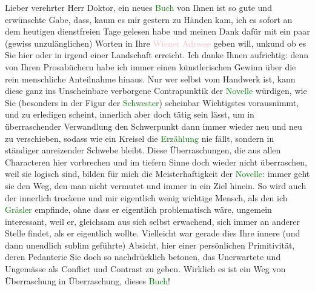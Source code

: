 \pstart{}Lieber verehrter Herr Doktor,\pend
\pstart
           ein neues \textcolor{green}{Buch}{}\ledrightnote{{$\rightarrow$}\textcolor{green}{Doktor Gräsler, Badearzt}} von Ihnen ist
               so gute und erwünschte Gabe, dass, kaum es mir gestern zu Händen kam, ich es sofort
               an dem heutigen dienstfreien Tage gelesen habe und meinen Dank dafür mit ein paar
               (gewiss unzulänglichen) Worten in Ihre \textcolor{pink}{Wiener Adresse}{}\ledrightnote{{$\rightarrow$}\textcolor{pink}{Sternwartestraße 71}} geben will, unkund ob es Sie hier oder in
               irgend einer Landschaft erreicht. Ich danke Ihnen aufrichtig: denn von Ihren
               Prosabüchern habe ich immer einen künstlerischen Gewinn über die rein menschliche
               Anteilnahme hinaus. Nur wer selbst vom Handwerk ist, kann diese ganz ins Unscheinbare
               verborgene Contrapunktik der \textcolor{green}{Novelle}{}\ledrightnote{{$\rightarrow$}\textcolor{green}{Doktor Gräsler, Badearzt}} würdigen, wie Sie (besonders in der Figur der \textcolor{green}{Schwester}{}\ledrightnote{{$\rightarrow$}\textcolor{green}{Doktor Gräsler, Badearzt}}) scheinbar Wichtigstes
               vorausnimmt, {\pb}und zu erledigen scheint,
               innerlich aber doch tätig sein lässt, um in überraschender Verwandlung den
               Schwerpunkt dann immer wieder neu und neu zu verschieben, sodass wie ein Kreisel die
                  \textcolor{green}{Erzählung}{}\ledrightnote{{$\rightarrow$}\textcolor{green}{Doktor Gräsler, Badearzt}} nie fällt,
               sondern in ständiger anreizender Schwebe bleibt. Diese Überraschungen, die aus allen
               Characteren hier vorbrechen und im tiefern Sinne doch wieder nicht überraschen, weil
               sie logisch sind, bilden für mich die Meisterhaftigkeit der \textcolor{green}{Novelle}{}\ledrightnote{{$\rightarrow$}\textcolor{green}{Doktor Gräsler, Badearzt}}: immer geht sie den Weg, den man
               nicht vermutet und immer in ein Ziel hinein. So wird auch der innerlich trockene und
               mir eigentlich wenig wichtige Mensch, als den ich \textcolor{green}{Gräsler}{}\ledrightnote{{$\rightarrow$}\textcolor{green}{Doktor Gräsler, Badearzt}} empfinde, ohne dass er eigentlich problematisch
               wäre, ungemein interessant, weil er, gleichsam aus sich selbst erwachend, sich immer
               an anderer Stelle findet, als er eigentlich wollte. Vielleicht war gerade dies Ihre
               innere (und dann unendlich sublim geführte) Absicht, hier einer persönlichen
               Primitivität, deren {\pb}Pedanterie Sie doch
               so nachdrücklich betonen, das Unerwartete und Ungemässe als Conflict und Contrast zu
               geben. Wirklich es ist ein Weg von Überraschung in Überraschung, dieses \textcolor{green}{Buch}{}\ledrightnote{{$\rightarrow$}\textcolor{green}{Doktor Gräsler, Badearzt}}!\pend
           
